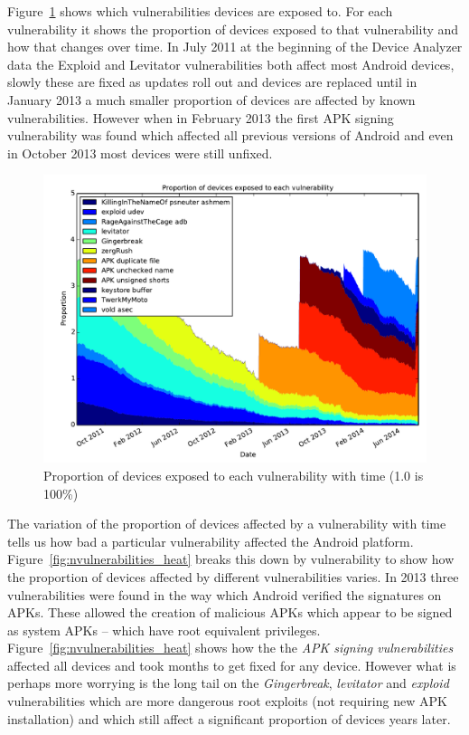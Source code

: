 \documentclass[conference,a4paper,twoside]{IEEEtran}
\begin{document}
Figure~\ref{fig:vulnerabilities} shows which vulnerabilities devices are exposed to.
For each vulnerability it shows the proportion of devices exposed to that vulnerability and how that changes over time.
In July 2011 at the beginning of the Device Analyzer data the Exploid and Levitator vulnerabilities both affect most Android devices, slowly these are fixed as updates roll out and devices are replaced until in January 2013 a much smaller proportion of devices are affected by known vulnerabilities.
However when in February 2013 the first APK signing vulnerability was found which affected all previous versions of Android and even in October 2013 most devices were still unfixed. %
\begin{figure}%
\centering
\includegraphics[width=\columnwidth]{figures/vulnerabilities}
\caption{Proportion of devices exposed to each vulnerability with time (1.0 is 100\%)}
\label{fig:vulnerabilities}
\end{figure}

The variation of the proportion of devices affected by a vulnerability with time tells us how bad a particular vulnerability affected the Android platform.
Figure~\ref{fig:nvulnerabilities_heat} breaks this down by vulnerability to show how the proportion of devices affected by different vulnerabilities varies.
In 2013 three vulnerabilities were found in the way which Android verified the signatures on APKs.
These allowed the creation of malicious APKs which appear to be signed as system APKs -- which have root equivalent privileges.
Figure~\ref{fig:nvulnerabilities_heat} shows how the the \emph{APK signing vulnerabilities} affected all devices and took months to get fixed for any device.
However what is perhaps more worrying is the long tail on the \emph{Gingerbreak}, \emph{levitator} and \emph{exploid} vulnerabilities which are more dangerous root exploits (not requiring new APK installation) and which still affect a significant proportion of devices years later.
\end{document}
